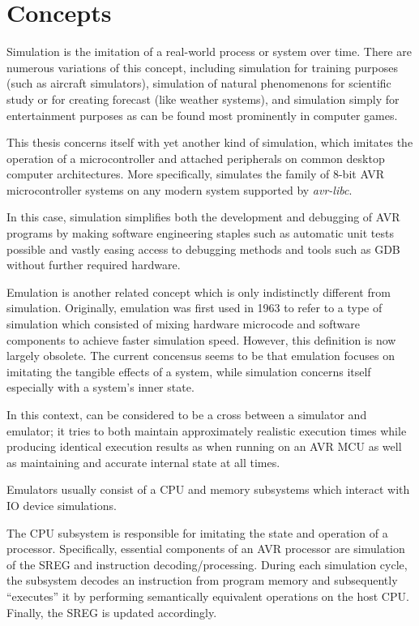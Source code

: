 
\chapter{Concepts} \label{chapter:concepts}

Simulation is the imitation of a real-world process or system over time\cite{wiki:simulation}.
There are numerous variations of this concept, including simulation for training purposes
(such as aircraft simulators), simulation of natural phenomenons for scientific study
or for creating forecast (like weather systems), and simulation simply for entertainment purposes
as can be found most prominently in computer games.

This thesis concerns itself with yet another kind of simulation, which imitates
the operation of a microcontroller and attached peripherals on common desktop computer architectures. More
specifically, \simavr simulates the family of 8-bit \ac{AVR} microcontroller systems
on any modern system supported by \emph{avr-libc}.

In this case, simulation simplifies both the development and debugging of \ac{AVR}
programs by making software engineering staples such as automatic unit tests possible
and vastly easing access to debugging methods and tools such as \ac{GDB} without further
required hardware.

Emulation is another related concept which is only indistinctly different from
simulation. Originally, emulation was first used in 1963 to refer to a type
of simulation which consisted of mixing hardware microcode and software components
to achieve faster simulation speed\cite{building_ibm}. However, this definition is now
largely obsolete. The current concensus seems to be that emulation focuses on imitating
the tangible effects of a system, while simulation concerns itself especially with
a system's inner state.

In this context, \simavr can be considered to be a cross between a simulator and
emulator; it tries to both maintain approximately realistic execution times while
producing identical execution results as when running on an \ac{AVR} \ac{MCU} as
well as maintaining and accurate internal state at all times.

Emulators usually consist of a \ac{CPU} and memory subsystems which interact with
\ac{IO} device simulations\cite{wiki:emulation}.

The \ac{CPU} subsystem is responsible
for imitating the state and operation of a processor. Specifically, essential components of an \ac{AVR}
processor are simulation of the \ac{SREG} and instruction decoding/processing.
During each simulation cycle, the subsystem decodes an instruction from program memory
and subsequently ``executes'' it by performing semantically equivalent operations on
the host \ac{CPU}. Finally, the \ac{SREG} is updated accordingly.

